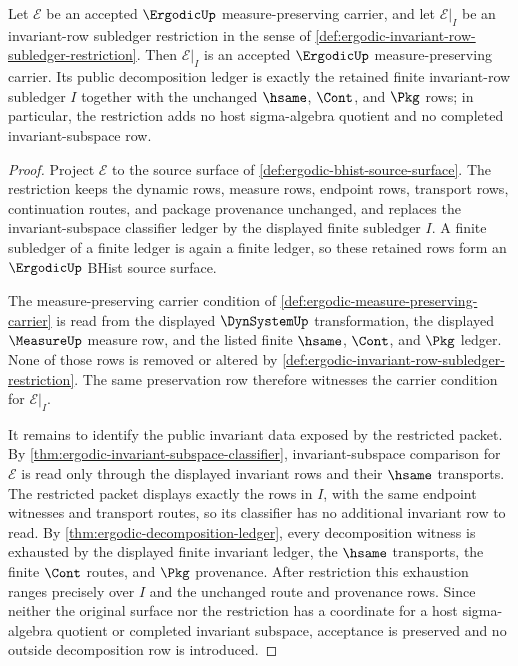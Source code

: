\begin{theorem}
\label{thm:ergodic-invariant-subledger-restriction-stays-carried}
Let $\mathcal E$ be an accepted $\ErgodicUp$ measure-preserving carrier, and let $\mathcal E|_I$ be an invariant-row subledger restriction in the sense of \autoref{def:ergodic-invariant-row-subledger-restriction}. Then $\mathcal E|_I$ is an accepted $\ErgodicUp$ measure-preserving carrier. Its public decomposition ledger is exactly the retained finite invariant-row subledger $I$ together with the unchanged $\hsame$, $\Cont$, and $\Pkg$ rows; in particular, the restriction adds no host sigma-algebra quotient and no completed invariant-subspace row.
\end{theorem}
\begin{proof}
Project $\mathcal E$ to the source surface of \autoref{def:ergodic-bhist-source-surface}. The restriction keeps the dynamic rows, measure rows, endpoint rows, transport rows, continuation routes, and package provenance unchanged, and replaces the invariant-subspace classifier ledger by the displayed finite subledger $I$. A finite subledger of a finite ledger is again a finite ledger, so these retained rows form an $\ErgodicUp$ BHist source surface.

The measure-preserving carrier condition of \autoref{def:ergodic-measure-preserving-carrier} is read from the displayed $\DynSystemUp$ transformation, the displayed $\MeasureUp$ measure row, and the listed finite $\hsame$, $\Cont$, and $\Pkg$ ledger. None of those rows is removed or altered by \autoref{def:ergodic-invariant-row-subledger-restriction}. The same preservation row therefore witnesses the carrier condition for $\mathcal E|_I$.

It remains to identify the public invariant data exposed by the restricted packet. By \autoref{thm:ergodic-invariant-subspace-classifier}, invariant-subspace comparison for $\mathcal E$ is read only through the displayed invariant rows and their $\hsame$ transports. The restricted packet displays exactly the rows in $I$, with the same endpoint witnesses and transport routes, so its classifier has no additional invariant row to read. By \autoref{thm:ergodic-decomposition-ledger}, every decomposition witness is exhausted by the displayed finite invariant ledger, the $\hsame$ transports, the finite $\Cont$ routes, and $\Pkg$ provenance. After restriction this exhaustion ranges precisely over $I$ and the unchanged route and provenance rows. Since neither the original surface nor the restriction has a coordinate for a host sigma-algebra quotient or completed invariant subspace, acceptance is preserved and no outside decomposition row is introduced.
\end{proof}

